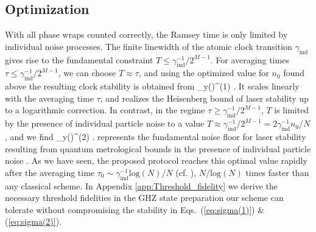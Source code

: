 \subsection{Optimization}
With all phase wraps counted correctly, the Ramsey time is only limited by
individual noise processes. The finite linewidth of the atomic clock transition
$\gamma_\mathrm{ind}$ gives rise to the fundamental constraint
$T\leq\gamma_\mathrm{ind}^{-1}/2^{M-1}$.
For averaging times
$\tau\leq\gamma_\mathrm{ind}^{-1}/2^{M-1}$, we can choose $T \approx \tau$, and
using the optimized value for $n_0$ found above the resulting clock stability is
obtained from 
\bel
	\label{eq:sigma(1)}
	\sigma_y(\tau)^{(1)} \approx	
	 \approx	{}
	.
\eel
It scales linearly with the averaging time $\tau$, and realizes the Heisenberg
bound of laser stability up to a logarithmic correction. In contrast, in the regime $\tau\geq\gamma_\mathrm{ind}^{-1}/2^{M-1}$, $T$ is limited
by the presence of individual particle noise to a value $T\approx \gamma_\mathrm{ind}^{-1}/2^{M-1}= 2 \gamma_\mathrm{ind}^{-1}n_0/N$, and we find
\bel
	\label{eq:sigma(2)}
	\sigma_y(\tau)^{(2)} \approx
	  .
\eel
{} represents the fundamental noise floor for laser stability
resulting from quantum metrological bounds in the presence of individual
particle noise \cite{Escher:2011fn}. As we have seen, the proposed protocol
reaches this optimal value rapidly after the averaging time $\tau_0 \sim  
\gamma_\mathrm{ind}^{-1} \mathrm{log}(N)/N$ (cf. ),
$N/\mathrm{log}(N)$ times faster than any classical scheme.
In Appendix \ref{app:Threshold_fidelity} we derive the necessary threshold fidelities in
the GHZ state preparation our scheme can tolerate without compromising the stability
in Eqs.~(\ref{eq:sigma(1)}) \& (\ref{eq:sigma(2)}).

